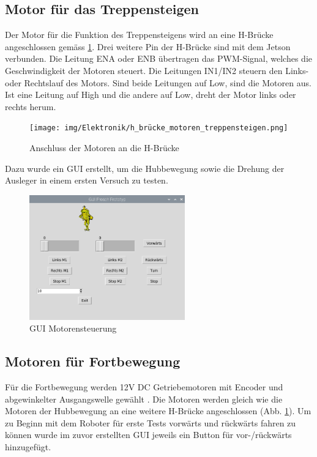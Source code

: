 \subsection{Motor für das Treppensteigen}
Der Motor für die Funktion des Treppensteigens wird an eine H-Brücke angeschlossen gemäss \ref{fig:hbrücke-treppe}. Drei weitere Pin der H-Brücke sind mit dem Jetson verbunden. Die Leitung ENA oder ENB übertragen das PWM-Signal, welches die Geschwindigkeit der Motoren steuert. Die Leitungen IN1/IN2 steuern den Links- oder Rechtslauf des Motors. Sind beide Leitungen auf Low, sind die Motoren aus. Ist eine Leitung auf High und die andere auf Low, dreht der Motor links oder rechts herum.

\begin{figure}[H]
  \texttt{[image: img/Elektronik/h\_brücke\_motoren\_treppensteigen.png]}
  \centering
  \caption{Anschluss der Motoren an die H-Brücke}
  \label{fig:hbrücke-treppe}
\end{figure}

Dazu wurde ein GUI erstellt, um die Hubbewegung sowie die Drehung der Ausleger in einem ersten Versuch zu testen.

\begin{figure}[H]
  \includegraphics[width=0.6\textwidth]{img/Elektronik/gui_motoren.png}
  \centering
  \caption{GUI Motorensteuerung}
  \label{fig:gui-motoren}
\end{figure}

\newpage

\subsection{Motoren für Fortbewegung}
Für die Fortbewegung werden 12V DC Getriebemotoren mit Encoder und abgewinkelter Ausgangswelle gewählt \cite{Motoren-Fortbewegung}. Die Motoren werden gleich wie die Motoren der Hubbewegung an eine weitere H-Brücke angeschlossen (Abb. \ref{fig:hbrücke-treppe}).
Um zu Beginn mit dem Roboter für erste Tests vorwärts und rückwärts fahren zu können wurde im zuvor erstellten GUI jeweils ein Button für vor-/rückwärts hinzugefügt.

